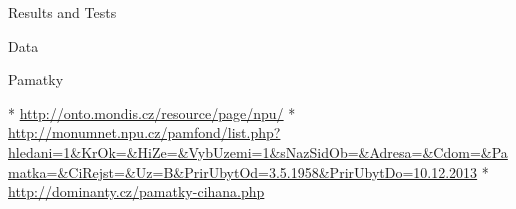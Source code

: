 
\chap Results and Tests 


\sec Data
~

\secc Pamatky

\begitems
  * \url{http://onto.mondis.cz/resource/page/npu/}
  * \url{http://monumnet.npu.cz/pamfond/list.php?hledani=1&KrOk=&HiZe=&VybUzemi=1&sNazSidOb=&Adresa=&Cdom=&Pamatka=&CiRejst=&Uz=B&PrirUbytOd=3.5.1958&PrirUbytDo=10.12.2013}
  * \url{http://dominanty.cz/pamatky-cihana.php}
\enditems





